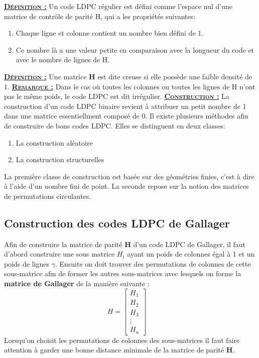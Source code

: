 \documentclass[french,nochapter,11pt]{rapportUB}
\begin{document}
\textsc{\textbf{\underline{Définition :}}} Un code LDPC régulier est défini comme l'espace nul d'une matrice de contrôle de parité H, qui a les propriétés suivantes:
\begin{enumerate}
  \item Chaque ligne et colonne contient un nombre bien défini de 1.
  \item Ce nombre là a une valeur petite en comparaison avec la longueur du code et avec le nombre de lignes de H.
\end{enumerate}
\vspace{0.4cm}
\textsc{\textbf{\underline{Définition :}}} Une matrice \textbf{H} est dite creuse si elle possède une faible densité de 1.\vspace{0.4cm}\newline
\textsc{\textbf{\underline{Remarque :}}} Dans le cas où toutes les colonnes ou toutes les lignes de H n'ont pas le même poids, le code LDPC est dit irrégulier.\vspace{0.4cm}\newline
\textsc{\textbf{\underline{Construction :}}} La construction d'un code LDPC binaire revient à attribuer un petit nombre de 1 dans une matrice essentiellment composé de 0. Il existe
plusieurs méthodes afin de construire de bons codes LDPC. Elles se distinguent en deux classes:
\begin{enumerate}
  \item La construction aléatoire
  \item La construction structurelles
\end{enumerate}
La première classe de construction est basée sur des géométries finies, c'est à dire à l'aide d'un nombre fini de point. La seconde repose sur la notion des matrices de 
permutations circulantes.\vspace{0.4cm}
\subsection{Construction des codes LDPC de Gallager}
Afin de construire la matrice de parité \textbf{H} d'un code LDPC de Gallager, il faut d'abord construire une sous matrice \textbf{$H_i$} ayant un poids de colonnes égal à 
1 et un poids de lignes $\gamma$. Ensuite on doit trouver des permutations de colonnes de cette sous-matrice afin de former les autres sous-matrices avec lesquels on forme 
la \textbf{matrice de Gallager} de la manière suivante :
$$H=
\begin{bmatrix}
  H_1 \\
  H_2 \\
  H_3 \\
  \vdots \\
  H_n
\end{bmatrix}
\quad
$$
\newline
Lorsqu'on choisit les permutations de colonnes des sous-matrices il faut faire attention à garder une bonne distance minimale de la matrice de parité \textbf{H}.
\clearpage
\end{document}
